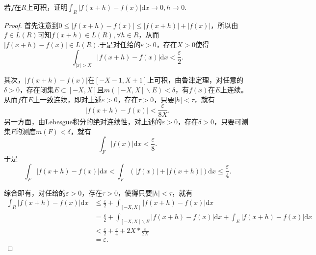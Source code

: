 \begin{exercise}
若$f$在$R$上可积，证明$\int_R|f(x+h)-f(x)|\mathrm{d}x\to0,h\to0$.
\end{exercise}

\begin{proof}
首先注意到$0\leq|f(x+h)-f(x)|\leq|f(x+h)|+|f(x)|$，所以由$f\in L(R)$可知$f(x+h)\in L(R),\forall h\in R$，从而$|f(x+h)-f(x)|\in L(R).$于是对任给的$\varepsilon>0$，存在$X>0$使得$$\int_{|x|>X}|f(x+h)-f(x)|\mathrm{d}x<\frac{\varepsilon}{2}.$$

其次，$|f(x+h)-f(x)|$在$[-X-1,X+1]$上可积，由鲁津定理，对任意的$\delta>0$，存在闭集$E\subset[-X,X]$且$m([-X,X]\backslash E)<\delta$，有$f(x)$在$E$上连续。从而$f$在$E$上一致连续，即对上述$\varepsilon>0$，存在$\tau>0$，只要$|h|<\tau$，就有
$$|f(x+h)-f(x)|<\frac{\varepsilon}{8X}.$$
另一方面，由Lebesgue积分的绝对连续性，对上述的$\varepsilon>0$，存在$\delta>0$，只要可测集$F$的测度$m(F)<\delta$，就有
$$\int_{F}|f(x)|\mathrm{d}x<\frac{\varepsilon}{8}.$$
于是$$\int_{F}|f(x+h)-f(x)|\mathrm{d}x<\int_{F}(|f(x)|+|f(x+h)|)\mathrm{d}x\leq\frac{\varepsilon}{4}.$$

综合即有，对任给的$\varepsilon>0$，存在$\tau>0$，使得只要$|h|<\tau$，就有
\begin{align*}
\int_R|f(x+h)-f(x)|\mathrm{d}x&\leq\frac{\varepsilon}{2}+\int_{[-X,X]}|f(x+h)-f(x)|\mathrm{d}x\\
&=\frac{\varepsilon}{2}+\int_{[-X,X]\backslash E}|f(x+h)-f(x)|\mathrm{d}x+\int_E|f(x+h)-f(x)|\mathrm{d}x\\
&<\frac{\varepsilon}{2}+\frac{\varepsilon}{4}+2X*\frac{\varepsilon}{2X}\\
&=\varepsilon.
\end{align*}
\end{proof}




\begin{exercise}
\hfill\\



\end{exercise}



\begin{exercise}
\hfill\\



\end{exercise}



\begin{exercise}
\hfill\\



\end{exercise}


